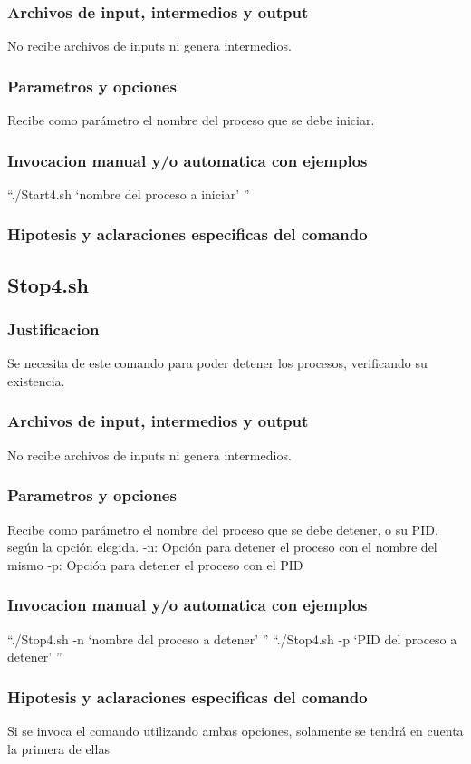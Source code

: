 \documentclass{article}
\begin{document}
		\subsubsection{Archivos de input, intermedios y output}
		No recibe archivos de inputs ni genera intermedios.
		\subsubsection{Parametros y opciones}
		Recibe como parámetro el nombre del proceso que se debe iniciar.
		\subsubsection{Invocacion manual y/o automatica con ejemplos}
		``./Start4.sh `nombre del proceso a iniciar' ''
		\subsubsection{Hipotesis y aclaraciones especificas del comando}
	
	\subsection{Stop4.sh}
	
		\subsubsection{Justificacion}
		Se necesita de este comando para poder detener los procesos, verificando su existencia.
		\subsubsection{Archivos de input, intermedios y output}
		No recibe archivos de inputs ni genera intermedios.
		\subsubsection{Parametros y opciones}
		Recibe como parámetro el nombre del proceso que se debe detener, o su PID, según la opción elegida.
		-n: Opción para detener el proceso con el nombre del mismo
		-p: Opción para detener el proceso con el PID  
		\subsubsection{Invocacion manual y/o automatica con ejemplos}
		``./Stop4.sh -n `nombre del proceso a detener' ''
		``./Stop4.sh -p `PID del proceso a detener' ''
		\subsubsection{Hipotesis y aclaraciones especificas del comando}
		Si se invoca el comando utilizando ambas opciones, solamente se tendrá en cuenta la primera de ellas
	
\end{document}

